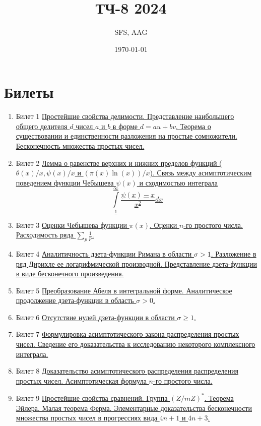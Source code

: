 \documentclass[a4paper,12pt]{article}
\title{ТЧ-8 2024}
\author{SFS, AAG}
\date{\today}
\newcommand{\TE}{\theta}
\newcommand{\SI}{\psi}
\newcommand{\IL}{\int\limits}
\newcommand{\os}{\left(}
\newcommand{\cs}{\right)}
\begin{document}
\maketitle


\tableofcontents
\newpage
\section{Билеты}
\begin{enumerate}
\item{Билет 1}
 \hyperlink{bil1}{Простейшие свойства делимости. Представление наибольшего общего делителя $d$ чисел $a$ и $b$ в форме $d = au+bv$. Теорема о существовании и единственности разложения на простые сомножители. Бесконечность множества простых чисел.}
\item{Билет 2}
 \hyperlink{bil2}{Лемма о равенстве верхних и нижних пределов функций ($\TE(x)/x, \SI(x)/x$ и $\os\pi(x)\ln(x)\cs/x$). Связь между асимптотическим поведением функции Чебышева $\SI(x)$ и сходимостью интеграла $$\IL_1^\infty \frac{\SI(x)-x}{x^2}dx$$}

\item{Билет 3}
\hyperlink{bil3}{Оценки Чебышева функции $\pi(x)$. Оценки $n$-го простого числа. Расходимость ряда $\sum_p \frac{1}{p}$.}

\item{Билет 4}
\hyperlink{bil4}{Аналитичность дзета-функции Римана в области $\sigma > 1$. Разложение в ряд Дирихле ее логарифмической производной. Представление дзета-функции в виде бесконечного произведения.}

\item{Билет 5}
\hyperlink{bil5}{Преобразование Абеля в интегральной форме. Аналитическое продолжение дзета-функции в область $\sigma > 0$.}

\item{Билет 6}
\hyperlink{bil6}{Отсутствие нулей дзета-функции в области $\sigma \ge 1$.}

\item{Билет 7}
\hyperlink{bil7}{Формулировка асимптотического закона распределения простых чисел. Сведение его доказательства к исследованию некоторого комплексного интеграла.}

\item{Билет 8}
\hyperlink{bil8}{Доказательство асимптотического распределения распределения простых чисел. Асимптотическая формула $n$-го простого числа.}


\item{Билет 9}
\hyperlink{bil9}{Простейшие свойства сравнений. Группа $\os Z/mZ \cs ^*$. Теорема Эйлера. Малая теорема Ферма. Элементарные доказательства бесконечности множества простых чисел в прогрессиях вида $4n+1$ и $4n+3$.}


\end{enumerate}
\end{document}
